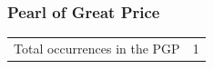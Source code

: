 	\subsubsection{Pearl of Great Price} %
		\label{COMFORTER-PGP}
	
		\begin{tabular}{ll}
			Total occurrences in the PGP & 1
		\end{tabular}
		
		\begin{compactdesc}
			\item[{\hyperref[MOSES-6-61]{Moses 6:61}}]
		\end{compactdesc}
		

	


	
